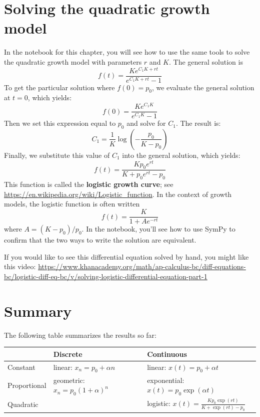 \documentclass[12pt]{book}
\theoremstyle{exercise}
\begin{document}
\section{Solving the quadratic growth model}

In the notebook for this chapter, you will see how to use the same tools to solve the quadratic growth model with parameters $r$ and $K$.  The general solution is
%
\[ f{\left (t \right )} = \frac{K e^{C_{1} K + r t}}{e^{C_{1} K + r t} - 1} \]
%
To get the particular solution where $f(0) = p_0$, we evaluate the general solution at $t=0$, which yields:
%
\[ f(0) = \frac{K e^{C_{1} K}}{e^{C_{1} K} - 1} \]
%
Then we set this expression equal to $p_0$ and solve for $C_1$.  The result is:
%
\[ C_1 = \frac{1}{K} \log{\left (- \frac{p_{0}}{K - p_{0}} \right )} \]
%
Finally, we substitute this value of $C_1$ into the general solution, which yields:
%
\[ f(t) = \frac{K p_{0} e^{r t}}{K + p_{0} e^{r t} - p_{0}} \]
%
This function is called the {\bf logistic growth curve}; see \url{https://en.wikipedia.org/wiki/Logistic_function}.  In the context of growth models, the logistic function is often written
%
\[ f(t) = \frac{K}{1 + A e^{-rt}} \]
%
where $A = (K - p_0) / p_0$.  In the notebook, you'll see how to use SymPy to confirm that the two ways to write the solution are equivalent.

If you would like to see this differential equation solved by hand, you might like this video: \url{https://www.khanacademy.org/math/ap-calculus-bc/diff-equations-bc/logistic-diff-eq-bc/v/solving-logistic-differential-equation-part-1}


\section{Summary}

The following table summarizes the results so far:

\begin{tabular}{l|l|l} 
         & Discrete & Continuous \\ 
\hline 
Constant & linear: $x_n = p_0 + \alpha n$ & linear: $x(t) = p_0 + \alpha t$ \\ 
 
Proportional & geometric: $x_n = p_0(1+\alpha)^n$ & exponential: $x(t) = p_0 \exp(\alpha t)$ \\ 
 
Quadratic &  & logistic: $x(t) = \frac{K p_0 \exp(rt)}{K + \exp(rt) - p_0}$ \\ 
\end{tabular} 
\end{document}
